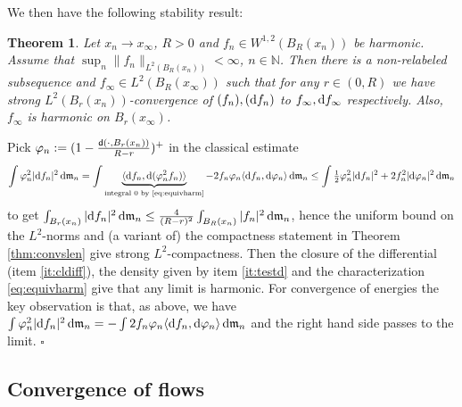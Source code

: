 \documentclass[11pt]{article}
\numberwithin{equation}{section}
\newtheorem{theorem}{Theorem}[section]
\newenvironment{idea}{\removelastskip\par\medskip   %
\noindent{\em Idea of the proof} \rm}{\penalty-20\null\hfill$\square$\par\medbreak}
\newcommand{\N}{\mathbb{N}}
\newcommand{\sfd}{{\sf d}}
\newcommand{\mm}{{\mathfrak m}}
\renewcommand{\d}{{\rm d}}
\newcommand\la{\langle}
\newcommand\ra{\rangle}
\begin{document}
We then have the following stability result:
\begin{theorem}\label{thm:stabharm}
Let $x_n\to x_\infty$, $R>0$ and $f_n\in W^{1,2}(B_R(x_n))$ be harmonic. Assume that  $\sup_n\|f_n\|_{L^2(B_R(x_n))}<\infty$, $n\in\N$. Then there is a non-relabeled subsequence and $f_\infty\in L^2(B_R(x_\infty))$ such that for any $r\in(0,R)$ we have  strong $L^2(B_r(x_n))$-convergence of $(f_n),(\d f_n)$ to $f_\infty,\d f_\infty$ respectively. Also, $f_\infty$ is harmonic on $B_r(x_\infty)$.
\end{theorem}
\begin{idea} Pick $\varphi_n:=(1-\frac{\sfd(\cdot, B_r(x_n))}{R-r})^+$ in the classical estimate
\[
\begin{split}
\int\varphi_n^2|\d f_n|^2\,\d\mm_n=\int\underbrace{\la\d f_n,\d(\varphi^2_nf_n)\ra}_{\text{integral  0 by \eqref{eq:equivharm}}}-2 f_n\varphi_n\la\d f_n,\d\varphi_n\ra\,\d\mm_n \leq\int\tfrac12{\varphi_n^2}|\d f_n|^2+2 f_n^2|\d \varphi_n|^2\,\d\mm_n
\end{split}
\]
to get $\int_{B_r(x_n)}|\d f_n|^2\,\d\mm_n\leq\frac{4}{(R-r)^2} \int_{B_R(x_n)}|f_n|^2\,\d\mm_n$, hence the uniform bound on the $L^2$-norms and (a variant of) the compactness statement in Theorem \ref{thm:convslen} give strong $L^2$-compactness. Then the closure of the differential (item \ref{it:cldiff}), the density given by item \ref{it:testd}  and the characterization \eqref{eq:equivharm} give that any limit is harmonic. For convergence of energies the key observation is that, as above, we have $\int\varphi_n^2|\d f_n|^2\,\d\mm_n=-\int 2 f_n\varphi_n\la\d f_n,\d\varphi_n\ra\,\d\mm_n$ and the right hand side passes to the limit.
\end{idea}



\subsection{Convergence of flows}\label{se:convflow}
\end{document}
